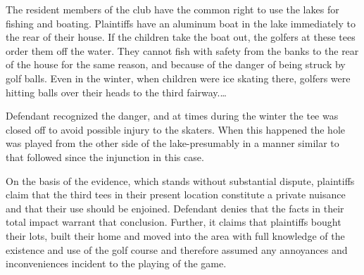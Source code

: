 The resident members of the club have the common right to use the lakes for
fishing and boating. Plaintiffs have an aluminum boat in the lake immediately to
the rear of their house. If the children take the boat out, the golfers at these
tees order them off the water. They cannot fish with safety from the banks to
the rear of the house for the same reason, and because of the danger of being
struck by golf balls. Even in the winter, when children were ice skating there,
golfers were hitting balls over their heads to the third fairway.\ldots

Defendant recognized the danger, and at times during the winter the tee was
closed off to avoid possible injury to the skaters. When this happened the hole
was played from the other side of the lake-presumably in a manner similar to
that followed since the injunction in this case.

On the basis of the evidence, which stands without substantial dispute,
plaintiffs claim that the third tees in their present location constitute a
private nuisance and that their use should be enjoined. Defendant denies that
the facts in their total impact warrant that conclusion. Further, it claims that
plaintiffs bought their lots, built their home and moved into the area with full
knowledge of the existence and use of the golf course and therefore assumed any
annoyances and inconveniences incident to the playing of the game.

